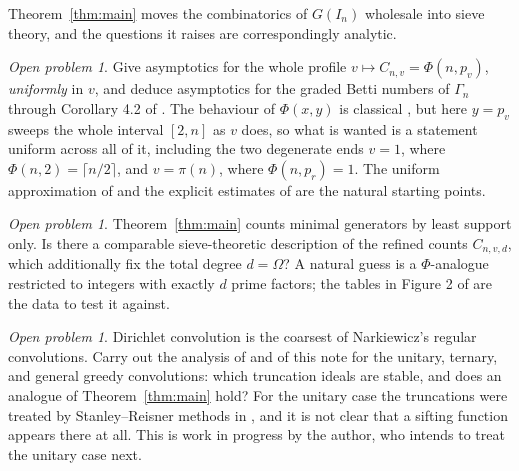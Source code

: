 \documentclass[a4paper,11pt,oneside,reqno]{amsart}
\theoremstyle{definition}
\theoremstyle{remark}
\newtheorem{openproblem}[definition]{Open problem}
\theoremstyle{plain}
\newcommand{\Om}{\Omega}
\newcommand{\Gam}{\Gamma}
\begin{document}
Theorem~\ref{thm:main} moves the combinatorics of \(G(I_n)\) wholesale into
sieve theory, and the questions it raises are correspondingly analytic.

\begin{openproblem}
  Give asymptotics for the whole profile \(v\mapsto C_{n,v} = \Phi(n,p_v)\),
  \emph{uniformly} in \(v\), and deduce asymptotics for the graded Betti
  numbers of \(\Gam_n\) through Corollary 4.2 of \cite{Snellman2000}. The
  behaviour of \(\Phi(x,y)\) is classical \cite{Buchstab,deBruijn,Tenenbaum},
  but here \(y = p_v\) sweeps the whole interval \([2,n]\) as \(v\) does, so what
  is wanted is a statement uniform across all of it, including the two
  degenerate ends \(v = 1\), where \(\Phi(n,2) = \lceil n/2\rceil\), and
  \(v = \pi(n)\), where \(\Phi(n,p_{r}) = 1\). The uniform approximation of
  \cite{deBruijn} and the explicit estimates of \cite{Fan} are the natural
  starting points.
\end{openproblem}

\begin{openproblem}
  Theorem~\ref{thm:main} counts minimal generators by least support only. Is
  there a comparable sieve-theoretic description of the refined counts
  \(C_{n,v,d}\), which additionally fix the total degree \(d = \Om\)? A natural
  guess is a \(\Phi\)-analogue restricted to integers with exactly \(d\) prime
  factors; the tables in Figure 2 of \cite{Snellman2000} are the data to test
  it against.
\end{openproblem}

\begin{openproblem}
  Dirichlet convolution is the coarsest of Narkiewicz's regular convolutions.
  Carry out the analysis of \cite{Snellman2000} and of this note for the
  unitary, ternary, and general greedy convolutions: which truncation ideals are
  stable, and does an analogue of Theorem~\ref{thm:main} hold? For the unitary
  case the truncations were treated by Stanley--Reisner methods in
  \cite{SnellmanUnitaryGeneral,SnellmanUnitaryN}, and it is not clear that a
  sifting function
  appears there at all. This is work in progress by the author, who intends to
  treat the unitary case next.
\end{openproblem}
\end{document}
